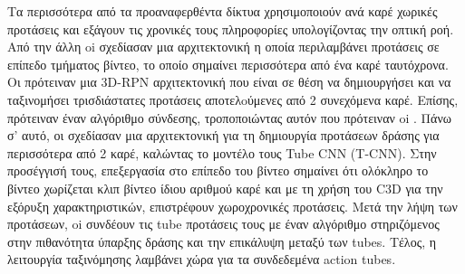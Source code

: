 Τα περισσότερα από τα προαναφερθέντα δίκτυα χρησιμοποιούν ανά καρέ χωρικές προτάσεις και εξάγουν 
τις χρονικές τους πληροφορίες υπολογίζοντας την οπτική ροή. Από την άλλη
oi \en \cite{DBLP:journals/corr/SahaSC17} \gr σχεδίασαν μια αρχιτεκτονική η οποία περιλαμβάνει προτάσεις σε επίπεδο τμήματος βίντεο, το οποίο σημαίνει  περισσότερα από ένα
καρέ ταυτόχρονα. Οι \en \cite{DBLP:journals/corr/SahaSC17} \gr  πρότειναν μια \en 3D-RPN \gr αρχιτεκτονική 
που είναι σε θέση να δημιουργήσει και να ταξινομήσει τρισδιάστατες προτάσεις   αποτελoύμενες από 2 συνεχόμενα  καρέ. Επίσης, πρότειναν έναν αλγόριθμο σύνδεσης,
τροποποιώντας αυτόν που πρότειναν oi \en \cite{DBLP:journals/corr/SahaSSTC16}\gr. Πάνω σ' αυτό, οι \en \cite{DBLP:journals/corr/HouCS17} \gr  σχεδίασαν μια αρχιτεκτονική για τη δημιουργία
προτάσεων δράσης για περισσότερα από 2 καρέ, καλώντας το μοντέλο τους \en Tube CNN (T-CNN)\gr. Στην προσέγγισή τους, επεξεργασία στο επίπεδο του  βίντεο σημαίνει
ότι ολόκληρο το βίντεο χωρίζεται κλιπ βίντεο ίδιου αριθμού καρέ  και με τη χρήση
του \en C3D \gr για την εξόρυξη χαρακτηριστικών, επιστρέφουν  χωροχρονικές προτάσεις. Μετά την λήψη των 
προτάσεων, oi \en\cite{DBLP:journals/corr/HouCS17}  \gr συνδέουν τις \en tube \gr προτάσεις τους  με έναν αλγόριθμο στηριζόμενος
στην πιθανότητα ύπαρξης δράσης  και την επικάλυψη μεταξύ των \en tubes\gr. Τέλος, η λειτουργία ταξινόμησης λαμβάνει χώρα για τα συνδεδεμένα \en action tubes\gr.



% 